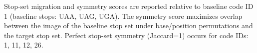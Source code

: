 Stop-set migration and symmetry scores are reported relative to baseline code ID 1 (baseline stops: UAA, UAG, UGA). The symmetry score maximizes overlap between the image of the baseline stop set under base/position permutations and the target stop set.
Perfect stop-set symmetry (Jaccard=1) occurs for code IDs: 1, 11, 12, 26.
